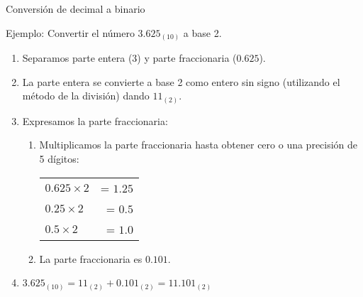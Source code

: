 \documentclass[11pt,a4paper,spanish]{beamer}
\begin{document}
\begin{frame}{Conversión de decimal a binario}

    Ejemplo: Convertir el número $3.625_{(10)}$ a base 2.

\begin{enumerate}
\item Separamos parte entera (3) y parte fraccionaria ($0.625$).

\item La parte entera se convierte a base 2 como entero sin signo (utilizando el método de la división)
    dando $11_{(2)}$.\pause

\item Expresamos la parte fraccionaria:

    \begin{enumerate}

    \item Multiplicamos la parte fraccionaria hasta obtener cero o una precisión de 5 dígitos:
        \pause
        \begin{tabular}[t]{ l r }

            $0.625{\times}2$ & = $1.25$\\\pause

            $0.25{\times}2$ & = $0.5$\\\pause

            $0.5{\times}2$ & = $1.0$\\

        \end{tabular}\pause

    \item La parte fraccionaria es $0.101$.

    \end{enumerate}\pause

    \item $3.625_{(10)}=11_{(2)} + 0.101_{(2)} = 11.101_{(2)}$

\end{enumerate}
\end{frame}
\end{document}
